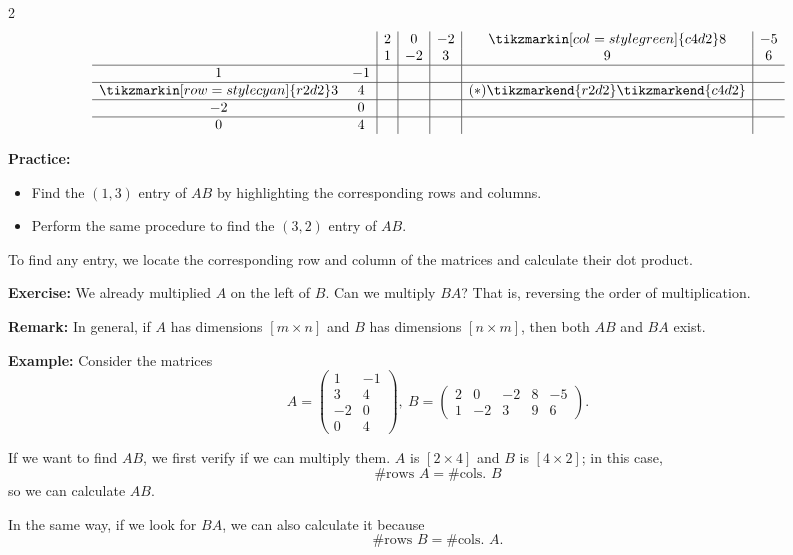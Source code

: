 \documentclass[12pt]{article}
\begin{document}
\begin{multicols}{2}
\[
\begin{array}{cc|c|c|c|c|c}
    &&2&0&-2&\tikzmarkin[col = style green]{c4d2}8&-5\\
    &&1&-2&3&9&6\\
    \hline1&-1&&&&&\\
    \hline\tikzmarkin[row = style cyan]{r2d2}3&4&&&&(\ast)\tikzmarkend{r2d2}\tikzmarkend{c4d2}&\\
\hline-2&0&&&&&\\
   \hline 0&4&&&&&\\
\end{array}
\]


\textbf{Practice:}
  \begin{itemize}
    \item Find the \((1,3)\) entry of \(AB\) by highlighting the corresponding rows and columns.
    \item Perform the same procedure to find the \((3,2)\) entry of \(AB\).
  \end{itemize}

To find any entry, we locate the corresponding row and column of the matrices and calculate their dot product.



\textbf{Exercise:}
We already multiplied \(A\) on the left of \(B\). Can we multiply \(BA\)? That is, reversing the order of multiplication.


\textbf{Remark:}
In general, if \(A\) has dimensions \([m\times n]\) and \(B\) has dimensions \([n\times m]\), then both \(AB\) and \(BA\) exist.


\textbf{Example:}
  Consider the matrices 
  \[
  A=\begin{pmatrix}
    1&-1\\
    3&4\\
    -2&0\\
    0&4
\end{pmatrix},\ B=\begin{pmatrix}
    2&0&-2&8&-5\\
    1&-2&3&9&6
\end{pmatrix}.
  \]

If we want to find \(AB\), we first verify if we can multiply them. \(A\) is \([2\times 4]\) and \(B\) is \([4\times 2]\); in this case, 
\[
\text{\#rows } A=\text{\#cols. } B
\]
so we can calculate \(AB\).\par 
In the same way, if we look for \(BA\), we can also calculate it because \[
\text{\#rows } B=\text{\#cols. } A.
\]



\end{multicols}
\end{document}

